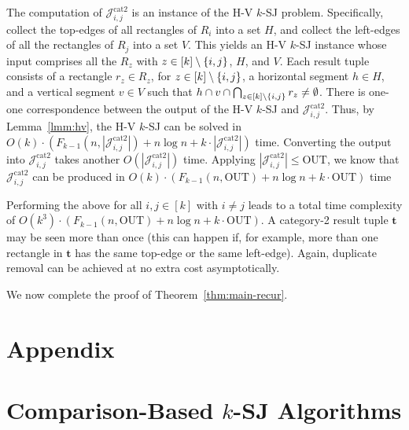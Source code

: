 \documentclass[acmsmall,review,anonymous]{acmart}
\def\vgap{\vspace{1mm}}
\def\extraspacing{\vspace{2mm} \noindent}
\def\J{\mathcal{J}}
\def\catt{\mathrm{cat2}}
\def\out{\mathrm{OUT}}
\begin{document}
{{{The computation of $\J^\catt_{i,j}$ is an instance of the H-V $k$-SJ problem. Specifically, collect the top-edges of all rectangles of $R_i$ into a set $H$, and collect the left-edges of all the rectangles of $R_j$ into a set $V$. This yields an H-V $k$-SJ instance whose input comprises all the $R_z$ with $z \in [k] \setminus \{i,j\}$,  $H$, and $V$. Each result tuple consists of a rectangle $r_z \in R_z$, for $z \in [k] \setminus \{i,j\}$, a horizontal segment $h \in H$, and a vertical segment $v \in V$ such that $h \cap v \cap \bigcap_{z \in [k] \setminus \{i,j\}} r_z \ne \emptyset$. There is one-one correspondence between the output of the H-V $k$-SJ and $\J^\catt_{i,j}$. Thus, by Lemma~\ref{lmm:hv}, the H-V $k$-SJ can be solved in $O(k) \cdot (F_{k-1}(n, |\J^\catt_{i,j}|) + n \log n + k \cdot |\J^\catt_{i,j}|)$ time. Converting the output into $\J^\catt_{i,j}$ takes another $O(|\J^\catt_{i,j}|)$ time. Applying $|\J^\catt_{i,j}| \le \out$, we know that $\J^\catt_{i,j}$ can be produced in $O(k) \cdot (F_{k-1}(n, \out) + n \log n + k \cdot \out)$ time

\vgap 

Performing the above for all $i, j \in [k]$ with $i \ne j$ leads to a total time complexity of $O(k^3) \cdot (F_{k-1}(n, \out) + n \log n + k \cdot \out)$. A category-2 result tuple $\bm{t}$ may be seen more than once (this can happen if, for example, more than one rectangle in $\bm{t}$ has the same top-edge or the same left-edge). Again, duplicate removal can be achieved at no extra cost asymptotically.

\vgap 

We now complete the proof of Theorem~\ref{thm:main-recur}.




\balance

\appendix 


\section*{Appendix}

\section{Comparison-Based $k$-SJ Algorithms} \label{app:comp-class}

}}}
\end{document}

